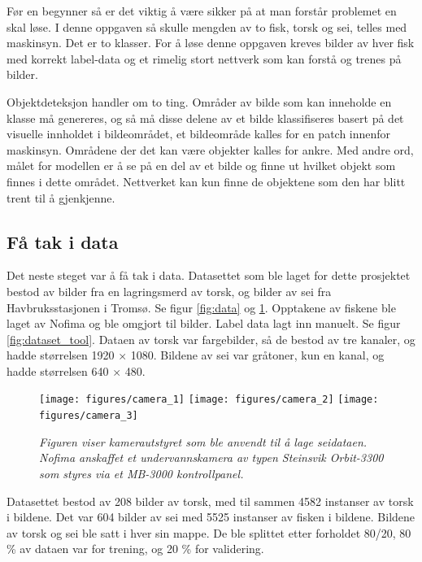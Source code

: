 Før en begynner så er det viktig å være sikker på at man forstår problemet en skal løse. I denne oppgaven så skulle mengden av to fisk, torsk og sei, telles med maskinsyn. Det er to klasser. For å løse denne oppgaven kreves bilder av hver fisk med korrekt label-data og et rimelig stort nettverk som kan forstå og trenes på bilder.

Objektdeteksjon handler om to ting. Områder av bilde som kan inneholde en klasse må genereres, og så må disse delene av et bilde klassifiseres basert på det visuelle innholdet i bildeområdet, et bildeområde kalles for en patch innenfor maskinsyn. Områdene der det kan være objekter kalles for ankre. Med andre ord, målet for modellen er å se på en del av et bilde og finne ut hvilket objekt som finnes i dette området. Nettverket kan kun finne de objektene som den har blitt trent til å gjenkjenne.

\subsection{Få tak i data}

Det neste steget var å få tak i data. Datasettet som ble laget for dette prosjektet bestod av bilder fra en lagringsmerd av torsk, og bilder av sei fra Havbruksstasjonen i Tromsø. Se figur \ref{fig:data} og \ref{fig:nofima}. Opptakene av fiskene ble laget av Nofima og ble omgjort til bilder. Label data lagt inn manuelt. Se figur \ref{fig:dataset_tool}. Dataen av torsk var fargebilder, så de bestod av tre kanaler, og hadde størrelsen 1920 $\times$ 1080. Bildene av sei var gråtoner, kun en kanal, og hadde størrelsen 640 $\times$ 480. %

\begin{figure}[h!]
\begin{center} 
\texttt{[image: figures/camera\_1]}
\texttt{[image: figures/camera\_2]}
\texttt{[image: figures/camera\_3]}
\caption{\small \sl Figuren viser kamerautstyret som ble anvendt til å lage seidataen. Nofima anskaffet et undervannskamera av typen Steinsvik Orbit-3300 som styres via et MB-3000 kontrollpanel. \label{fig:nofima}} 
\end{center} 
\end{figure} 

Datasettet bestod av 208 bilder av torsk, med til sammen 4582 instanser av torsk i bildene. Det var 604 bilder av sei med 5525 instanser av fisken i bildene. Bildene av torsk og sei ble satt i hver sin mappe. De ble splittet etter forholdet 80/20, 80 \% av dataen var for trening, og 20 \% for validering.

